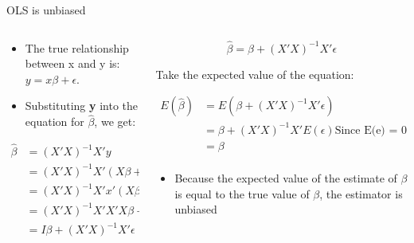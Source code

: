 \documentclass[australian,ignorenonframetext,aspectratio=169]{beamer}
\providecommand{\tightlist}{%
  \setlength{\itemsep}{0pt}\setlength{\parskip}{0pt}}
\begin{document}
\begin{frame}{OLS is unbiased}
\protect\hypertarget{ols-is-unbiased}{}

\begin{columns}[T]
\begin{column}{0.5\textwidth}
\begin{itemize}
\item
  The true relationship between x and y is: \(y = x\beta + \epsilon\).
\item
  Substituting \textbf{y} into the equation for \(\widehat{\beta}\), we
  get:
\end{itemize}

\[
\begin{aligned}
\widehat{\beta} &= (X'X)^{-1}X'y\\
&= (X'X)^{-1}X'(X\beta + \epsilon)\\
&= (X'X)^{-1}X'x'(X\beta+\epsilon)\\
&= (X'X)^{-1}X'X'X\beta + (X'X)^{-1}X'\epsilon\\
&= I\beta + (X'X)^{-1}X'\epsilon\\
\end{aligned}
\]
\end{column}

\begin{column}{0.5\textwidth}
\[\widehat{\beta} = \beta + (X'X)^{-1}X'\epsilon\]

Take the expected value of the equation:

\[
\begin{aligned}
E(\widehat{\beta}) &= E(\beta + (X'X)^{-1}X'\epsilon)\\
&= \beta + (X'X)^{-1}X'E(\epsilon) \text{Since E(e) = 0}\\
&= \beta\\
\end{aligned}
\]

\begin{itemize}
\tightlist
\item
  Because the expected value of the estimate of \(\beta\) is equal to
  the true value of \(\beta\), the estimator is unbiased
\end{itemize}
\end{column}
\end{columns}

\end{frame}
\end{document}

